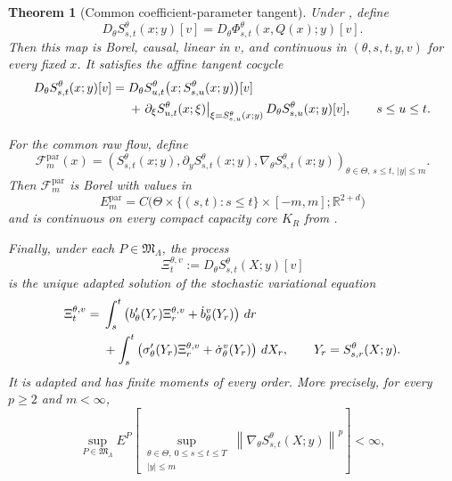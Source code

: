 \documentclass[11pt,reqno]{amsart}
\theoremstyle{plain}
\newtheorem{theorem}{Theorem}[section]
\theoremstyle{definition}
\newcommand{\R}{\mathbb R}
\newcommand{\dd}{\,d}
\newcommand{\norm}[1]{\left\lVert #1\right\rVert}
\begin{document}
\begin{theorem}[Common coefficient-parameter tangent]
\label{thm:parametric-tangent}
Under , define
\[
  D_\theta S_{s,t}^\theta(x;y)[v]
  =D_\theta\Phi_{s,t}^\theta(x,Q(x);y)[v].
\]
Then this map is Borel, causal, linear in \(v\), and continuous in
\((\theta,s,t,y,v)\) for every fixed \(x\).  It satisfies the affine tangent
cocycle
\begin{align}
  D_\theta S_{s,t}^\theta(x;y)[v]
  ={}&D_\theta S_{u,t}^\theta
  \bigl(x;S_{s,u}^\theta(x;y)\bigr)[v]
  \notag\\
  &+\left.
    \partial_\xi S_{u,t}^\theta(x;\xi)
    \right|_{\xi=S_{s,u}^\theta(x;y)}
    D_\theta S_{s,u}^\theta(x;y)[v],
  \qquad s\le u\le t.
  \label{eq:parametric-affine-cocycle}
\end{align}

For the common raw flow, define
\begin{equation}\label{eq:parametric-flow-field}
  \mathscr F_m^{\mathrm{par}}(x)
  =
  \left(
    S_{s,t}^\theta(x;y),
    \partial_yS_{s,t}^\theta(x;y),
    \nabla_\theta S_{s,t}^\theta(x;y)
  \right)_{\theta\in\Theta,\,s\le t,\,|y|\le m}.
\end{equation}
Then \(\mathscr F_m^{\mathrm{par}}\) is Borel with values in
\begin{equation}\label{eq:parametric-field-space}
  E_m^{\mathrm{par}}
  =C\bigl(
    \Theta\times\{(s,t):s\le t\}\times[-m,m];\R^{2+d}
  \bigr)
\end{equation}
and is continuous on every compact capacity core \(K_R\) from
.

Finally, under each \(P\in\mathfrak M_\Lambda\), the process
\[
  \Xi_t^{\theta,v}
  :=D_\theta S_{s,t}^\theta(X;y)[v]
\]
is the unique adapted solution of the stochastic variational equation
\begin{align}
  \Xi_t^{\theta,v}
  ={}&\int_s^t
    \left(
      b_\theta'(Y_r)\Xi_r^{\theta,v}
      +\dot b_\theta^v(Y_r)
    \right)\dd r
  \notag\\
  &+\int_s^t
    \left(
      \sigma_\theta'(Y_r)\Xi_r^{\theta,v}
      +\dot\sigma_\theta^v(Y_r)
    \right)\dd X_r,
  \qquad
  Y_r=S_{s,r}^\theta(X;y).
  \label{eq:modelwise-parametric-variation}
\end{align}
It is adapted and has finite moments of every order.  More precisely, for
every \(p\ge2\) and \(m<\infty\),
\begin{equation}
  \sup_{P\in\mathfrak M_\Lambda}
  E^P\left[
    \sup_{\substack{\theta\in\Theta,\ 0\le s\le t\le T\\ |y|\le m}}
    \norm{\nabla_\theta S_{s,t}^\theta(X;y)}^p
  \right]<\infty,
  \label{eq:uniform-parametric-moments}
\end{equation}
\end{theorem}
\end{document}

